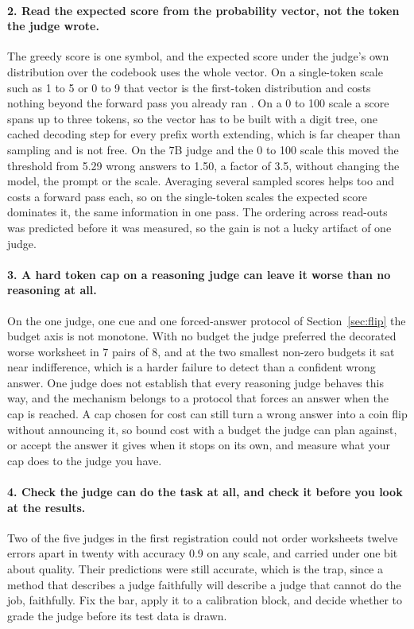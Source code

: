 \documentclass{article}
\theoremstyle{definition}
\theoremstyle{remark}
\begin{document}
\paragraph{2. Read the expected score from the probability vector, not the token the judge wrote.}
The greedy score is one symbol, and the expected score under the judge's own distribution over the codebook uses the whole vector.
On a single-token scale such as 1 to 5 or 0 to 9 that vector is the first-token distribution and costs nothing beyond the forward pass you already ran \citep{liu2023geval}.
On a 0 to 100 scale a score spans up to three tokens, so the vector has to be built with a digit tree, one cached decoding step for every prefix worth extending, which is far cheaper than sampling and is not free.
On the 7B judge and the 0 to 100 scale this moved the threshold from 5.29 wrong answers to 1.50, a
factor of 3.5, without changing the model, the prompt or the scale.
Averaging several sampled scores helps too and costs a forward pass each, so on the single-token scales the expected score dominates it, the same information in one pass.
The ordering across read-outs was predicted before it was measured, so the gain is not a lucky
artifact of one judge.

\paragraph{3. A hard token cap on a reasoning judge can leave it worse than no reasoning at all.}
On the one judge, one cue and one forced-answer protocol of Section~\ref{sec:flip} the budget axis is not monotone.
With no budget the judge preferred the decorated worse worksheet in 7 pairs of 8, and at the two smallest non-zero budgets it sat near indifference, which is a harder failure to detect than a confident wrong answer.
One judge does not establish that every reasoning judge behaves this way, and the mechanism belongs to a protocol that forces an answer when the cap is reached.
A cap chosen for cost can still turn a wrong answer into a coin flip without announcing it, so bound cost with a budget the judge can plan against, or accept the answer it gives when it stops on its own, and measure what your cap does to the judge you have.

\paragraph{4. Check the judge can do the task at all, and check it before you look at the results.}
Two of the five judges in the first registration could not order worksheets twelve errors apart in
twenty with accuracy 0.9 on any scale, and carried under one bit about quality.
Their predictions were still accurate, which is the trap, since a method that describes a judge faithfully will describe a judge that cannot do the job, faithfully.
Fix the bar, apply it to a calibration block, and decide whether to grade the judge before its test
data is drawn.
\end{document}
